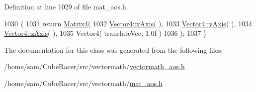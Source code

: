 Definition at line 1029 of file mat\-\_\-aos.\-h.


\begin{DoxyCode}
1030 \{
1031     \textcolor{keywordflow}{return} \hyperlink{classVectormath_1_1Aos_1_1Matrix4_a37fd3dbd4a7b1a72707b394e550d79c7}{Matrix4}(
1032         \hyperlink{classVectormath_1_1Aos_1_1Vector4_a2d3d445ccc2312e61f9c580eddb96abe}{Vector4::xAxis}( ),
1033         \hyperlink{classVectormath_1_1Aos_1_1Vector4_abbcd87fdbbebd6d6b8cfb50e0d3a40ba}{Vector4::yAxis}( ),
1034         \hyperlink{classVectormath_1_1Aos_1_1Vector4_a38d4fa96d926c28f7499feef11e546e3}{Vector4::zAxis}( ),
1035         Vector4( translateVec, 1.0f )
1036     );
1037 \}
\end{DoxyCode}


The documentation for this class was generated from the following files\-:\begin{DoxyCompactItemize}
\item 
/home/sam/\-Cube\-Racer/src/vectormath/\hyperlink{vectormath__aos_8h}{vectormath\-\_\-aos.\-h}\item 
/home/sam/\-Cube\-Racer/src/vectormath/\hyperlink{mat__aos_8h}{mat\-\_\-aos.\-h}\end{DoxyCompactItemize}
